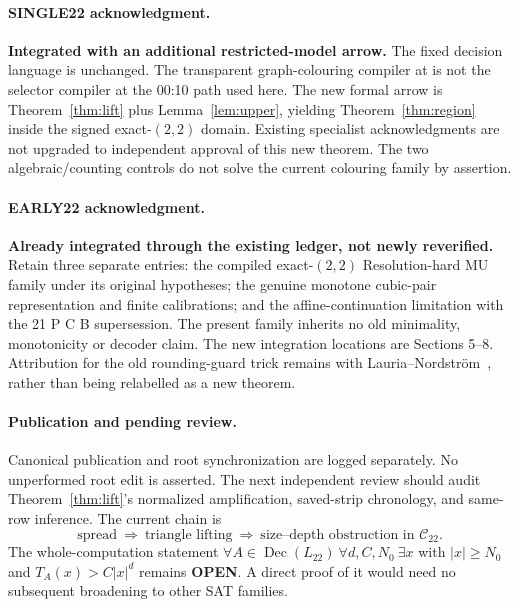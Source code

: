 \documentclass[11pt]{article}
\newcommand{\Cdom}{\mathcal C_{22}}
\begin{document}
\paragraph{SINGLE22 acknowledgment.}
\textbf{Integrated with an additional restricted-model arrow.} The fixed
decision language is unchanged. The transparent graph-colouring compiler at
is not the selector compiler at the 00:10 path used here. The new formal
arrow is Theorem~\ref{thm:lift} plus Lemma~\ref{lem:upper}, yielding
Theorem~\ref{thm:region} inside the signed exact-$(2,2)$ domain. Existing
specialist acknowledgments are not upgraded to independent approval of this
new theorem. The two algebraic/counting controls do not solve the current
colouring family by assertion.

\paragraph{EARLY22 acknowledgment.}
\textbf{Already integrated through the existing ledger, not newly reverified.}
Retain three separate entries: the compiled exact-$(2,2)$ Resolution-hard
MU family under its original hypotheses; the genuine monotone cubic-pair
representation and finite calibrations; and the affine-continuation
limitation with the 21 P C B supersession. The present family inherits no
old minimality, monotonicity or decoder claim. The new integration locations
are Sections 5--8. Attribution for the old rounding-guard trick remains with
Lauria--Nordstr\"om~\cite{lauria}, rather than being relabelled as a new theorem.

\paragraph{Publication and pending review.}
Canonical publication and root synchronization are logged separately. No
unperformed root edit is asserted. The next independent review should audit
Theorem~\ref{thm:lift}'s normalized amplification, saved-strip chronology,
and same-row inference. The current chain is
\[
\text{spread}\ \Longrightarrow\ \text{triangle lifting}\
\Longrightarrow\ \text{size--depth obstruction in }\Cdom .
\]
The whole-computation statement
$\forall A\in\operatorname{Dec}(L_{22})\ \forall d,C,N_0\ \exists x$
with $|x|\ge N_0$ and $T_A(x)>C|x|^d$ remains \textbf{OPEN}. A direct proof
of it would need no subsequent broadening to other SAT families.
\end{document}
